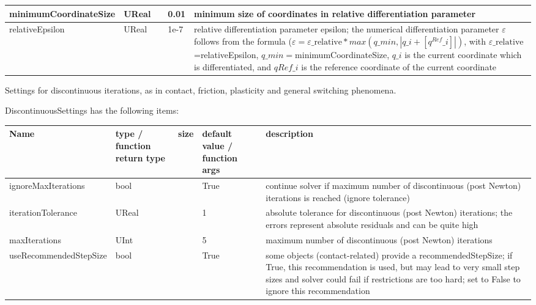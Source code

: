 \begin{center}
\begin{longtable}{| p{4.2cm} | p{2.5cm} | p{0.3cm} | p{3.0cm} | p{6cm} |}
    minimumCoordinateSize &     UReal &      &     0.01 &     minimum size of coordinates in relative differentiation parameter\\ \hline
    relativeEpsilon &     UReal &      &     1e-7 &     relative differentiation parameter epsilon; the numerical differentiation parameter $\varepsilon$ follows from the formula ($\varepsilon = \varepsilon\_\mathrm{relative}*max(q\_{min}, |q\_i + [q^{Ref}\_i]|)$, with $\varepsilon\_\mathrm{relative}$=relativeEpsilon, $q\_{min} = $minimumCoordinateSize, $q\_i$ is the current coordinate which is differentiated, and $qRef\_i$ is the reference coordinate of the current coordinate\\ \hline
	  \end{longtable}
	\end{center}



\label{sec:DiscontinuousSettings}
Settings for discontinuous iterations, as in contact, friction, plasticity and general switching phenomena.

\noindent DiscontinuousSettings has the following items:
\begin{center}
  \footnotesize
  \begin{longtable}{| p{4.2cm} | p{2.5cm} | p{0.3cm} | p{3.0cm} | p{6cm} |}
    \hline
    \bf Name & \bf type / function return type & \bf size & \bf default value / function args & \bf description \\ \hline
    ignoreMaxIterations &     bool &      &     True &     continue solver if maximum number of discontinuous (post Newton) iterations is reached (ignore tolerance)\\ \hline
    iterationTolerance &     UReal &      &     1 &     absolute tolerance for discontinuous (post Newton) iterations; the errors represent absolute residuals and can be quite high\\ \hline
    maxIterations &     UInt &      &     5 &     maximum number of discontinuous (post Newton) iterations\\ \hline
    useRecommendedStepSize &     bool &      &     True &     some objects (contact-related) provide a recommendedStepSize; if True, this recommendation is used, but may lead to very small step sizes and solver could fail if restrictions are too hard; set to False to ignore this recommendation\\ \hline
	  \end{longtable}
	\end{center}


